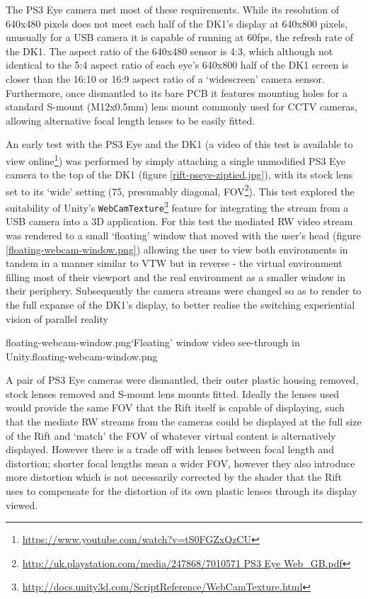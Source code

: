 The PS3 Eye camera met most of these requirements. While its resolution of 640x480 pixels does not meet each half of the DK1's display at 640x800 pixels, unusually for a USB camera it is capable of running at 60fps, the refresh rate of the DK1. The aspect ratio of the 640x480 sensor is 4:3, which although not identical to the 5:4 aspect ratio of each eye's 640x800 half of the DK1 screen is closer than the 16:10 or 16:9 aspect ratio of a `widescreen' camera sensor. Furthermore, once dismantled to its bare PCB it features mounting holes for a standard S-mount (M12x0.5mm) lens mount commonly used for CCTV cameras, allowing alternative focal length lenses to be easily fitted.

An early test with the PS3 Eye and the DK1 (a video of this test is available to view online\footnote{\url{https://www.youtube.com/watch?v=tS0FGZxQzCU}}) was performed by simply attaching a single unmodified PS3 Eye camera to the top of the DK1 (figure \ref{rift-pseye-ziptied.jpg}), with its stock lens set to its `wide' setting (75\textdegree, presumably diagonal, FOV\footnote{\url{http://uk.playstation.com/media/247868/7010571 PS3 Eye Web_GB.pdf}}). This test explored the suitability of Unity's \texttt{WebCamTexture}\footnote{\url{http://docs.unity3d.com/ScriptReference/WebCamTexture.html}} feature for integrating the stream from a USB camera into a 3D application. For this test the mediated RW video stream was rendered to a small `floating' window that moved with the user's head (figure \ref{floating-webcam-window.png}) allowing the user to view both environments in tandem in a manner similar to VTW but in reverse - the virtual environment filling most of their viewport and the real environment as a smaller window in their periphery. Subsequently the camera streams were changed so as to render to the full expanse of the DK1's display, to better realise the switching experiential vision of parallel reality

       {floating-webcam-window.png}{`Floating' window video see-through in Unity.}{floating-webcam-window.png}

A pair of PS3 Eye cameras were dismantled, their outer plastic housing removed, stock lenses removed and S-mount lens mounts fitted. Ideally the lenses used would provide the same FOV that the Rift itself is capable of displaying, such that the mediate RW streams from the cameras could be displayed at the full size of the Rift and `match' the FOV of whatever virtual content is alternatively displayed. However there is a trade off with lenses between focal length and distortion; shorter focal lengths mean a wider FOV, however they also introduce more distortion which is not necessarily corrected by the shader that the Rift uses to compensate for the distortion of its own plastic lenses through its display viewed.

